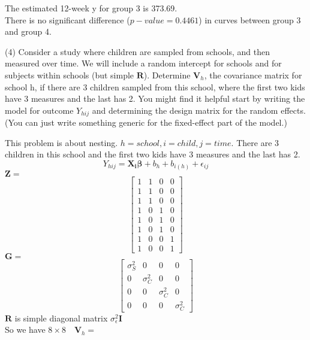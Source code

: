 \documentclass[12pt, utf8]{article}
\begin{document}
The estimated 12-week y for group 3 is 373.69. \\
There is no significant difference ($p-value = 0.4461$) in curves between group 3 and group 4.  




\begin{problem}
(4) Consider a study where children are sampled from schools, and then measured over time.  We will include a random intercept for schools and for subjects within schools (but simple $\boldsymbol{R}$). Determine $\boldsymbol{V}_h$, the covariance matrix for school h, if there are 3 children sampled from this school, where the first two kids have 3 measures and the last has 2.  You might find it helpful start by writing the model for outcome $Y_{hij}$ and determining the design matrix for the random effects.  (You can just write something generic for the fixed-effect part of the model.) 
\end{problem}
This problem is about nesting. $h = school, i = child, j = time$. There are 3 children in this school and the first two kids have 3 measures and the last has 2. \\
\begin{equation}
Y_{hij} = \boldsymbol{X_i \beta} + b_h + b_{i(h)} + \epsilon_{ij} 
\end{equation}
$\boldsymbol{Z} = $
\[
\begin{bmatrix}
1 & 1 & 0 & 0  \\
1 & 1 & 0 & 0  \\
1 & 1 & 0 & 0  \\
1 & 0 & 1 & 0  \\
1 & 0 & 1 & 0  \\
1 & 0 & 1 & 0  \\
1 & 0 & 0 & 1  \\
1 & 0 & 0 & 1
\end{bmatrix}
\]
$\boldsymbol{G} = $
\[
\begin{bmatrix}
\sigma^2_{S} & 0 & 0 & 0   \\
 0 & \sigma^2_{C}  & 0 & 0 \\
 0 & 0  & \sigma^2_{C} & 0 \\
 0 & 0 & 0 & \sigma^2_{C}
\end{bmatrix}
\]
$\boldsymbol{R}$ is simple diagonal matrix $\sigma^2_{\epsilon}\boldsymbol{I}$ \\
So we have $8 \times 8 \quad \boldsymbol{V}_h = $
\end{document}
